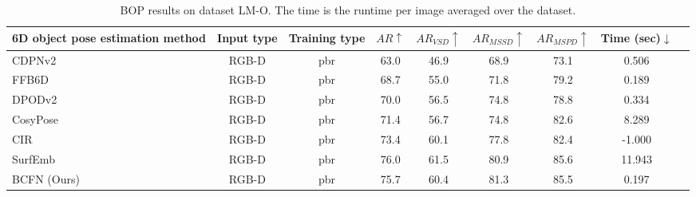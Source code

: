 \begin{sidewaystable}[htbp]
        \centering
        \caption{
                BOP results on dataset LM-O. The time is the runtime per image averaged over the dataset.
        }
        \begin{tabular}{l c c c c c c c c}
        \toprule
        6D object pose estimation method &Input type&Training type&$AR\uparrow$&$AR_{VSD}\uparrow$&$AR_{MSSD}\uparrow$&$AR_{MSPD}\uparrow$&Time (sec)$\downarrow$\\
        \midrule
        CDPNv2~\cite{li2019cdpn} & RGB-D & pbr & 	63.0	&46.9&	68.9&	73.1&	0.506 \\
        FFB6D~\cite{he2021ffb6d} & RGB-D & pbr & 68.7 & 55.0 & 71.8	& 79.2	& 0.189 \\
        DPODv2~\cite{shugurov2021dpodv2} & RGB-D & pbr & 70.0&	56.5&	74.8&	78.8&	0.334 \\
        CosyPose~\cite{labbe2020cosypose} & RGB-D & pbr & 71.4 &	56.7 &	74.8 &	82.6 &	8.289 \\
        CIR~\cite{lipson2022cir} & RGB-D & pbr & 	73.4	&60.1&	77.8&	82.4	&-1.000 \\
        SurfEmb~\cite{haugaard2022surfemb} & RGB-D & pbr &	76.0&	61.5&	80.9&	85.6&	11.943 \\
        \midrule
        BCFN (Ours) & RGB-D& pbr & 75.7 & 60.4 & 81.3 & 85.5 & 0.197\\
        \bottomrule
        \end{tabular}
\label{tab:lmo_bop}
\end{sidewaystable}